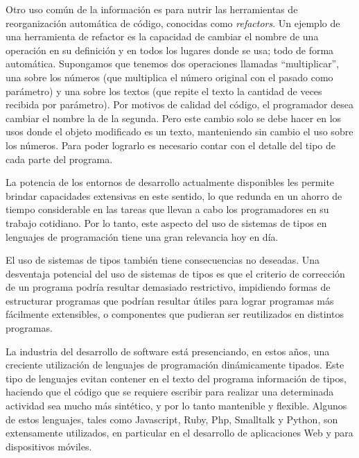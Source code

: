 \documentclass[a4paper,10pt]{article}
\begin{document}
Otro uso común de la información es para nutrir las herramientas de reorganización automática de código, conocidas como \emph{refactors}\cite{Opdyke92a}.  
Un ejemplo de una herramienta de refactor es la capacidad de cambiar el nombre de una operación en su definición y en todos los lugares donde se usa; todo de forma automática. Supongamos que tenemos dos operaciones llamadas ``multiplicar'', una sobre los números (que multiplica el número original con el pasado como parámetro) y una sobre los textos (que repite el texto la cantidad de veces recibida por parámetro). Por motivos de calidad del código, el programador desea cambiar el nombre la de la segunda. Pero este cambio solo se debe hacer en los usos donde el objeto modificado es un texto, manteniendo sin cambio el uso sobre los números. Para poder lograrlo es necesario contar con el detalle del tipo de cada parte del programa. 

La potencia de los entornos de desarrollo actualmente disponibles les permite brindar capacidades extensivas en este sentido, lo que redunda en un ahorro de tiempo considerable en las tareas que llevan a cabo los programadores en su trabajo cotidiano. Por lo tanto, este aspecto del uso de sistemas de tipos en lenguajes de programación tiene una gran relevancia hoy en día.

El uso de sistemas de tipos también tiene consecuencias no deseadas\cite{klein12a,hanen10a}.
Una desventaja potencial del uso de sistemas de tipos es que el criterio de corrección de un programa podría resultar demasiado restrictivo, impidiendo formas de estructurar programas que podrían resultar útiles\cite{Card85c} para lograr programas más fácilmente extensibles, o componentes que pudieran ser reutilizados en distintos programas.

La industria del desarrollo de software está presenciando, en estos años, una creciente utilización de lenguajes de programación dinámicamente tipados. Este tipo de lenguajes evitan contener en el texto del programa información de tipos, haciendo que el código que se requiere escribir para realizar una determinada actividad sea mucho más sintético, y por lo tanto mantenible y flexible. 
Algunos de estos lenguajes, tales como Javascript, Ruby, Php, Smalltalk y Python, son extensamente utilizados, en particular en el desarrollo de aplicaciones Web y para dispositivos móviles.
\end{document}
